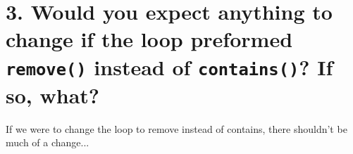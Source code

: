 \documentclass[letter,11pt]{scrartcl}
\begin{document}

\section*{3. Would you expect anything to change if the loop preformed
  \texttt{remove()} instead of \texttt{contains()}? If so, what?}

If we were to change the loop to remove instead of contains, there shouldn't
be much of a change...

\end{document}
